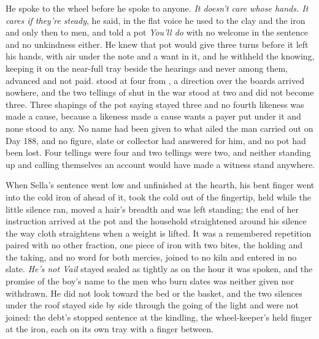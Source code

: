 He spoke to the wheel before he spoke to anyone. \emph{It doesn't care whose hands. It cares if they're steady}, he said, in the flat voice he used to the clay and the iron and only then to men, and told a pot \emph{You'll do} with no welcome in the sentence and no unkindness either. He knew  that pot would give three turns before it left his hands, with air under the note and a want in it, and he withheld the knowing, keeping it on the near-full tray beside the hearings and never among them, advanced and not paid.  stood at four from , a direction over the boards arrived nowhere, and the two tellings of  shut in the war stood at two and did not become three. Three shapings of the pot saying stayed three and no fourth likeness was made a cause, because a likeness made a cause wants a payer put under it and none stood to any. No name had been given to what ailed the man carried out on Day 188, and no figure, slate or collector had answered for him, and no pot had been lost. Four tellings were four and two tellings were two, and neither standing up and calling themselves an account would have made a witness stand anywhere.

When Sella's sentence went low and unfinished at the hearth, his bent finger went into the cold iron of  ahead of it, took the cold out of the fingertip, held while the little silence ran, moved a hair's breadth and was left standing; the end of her instruction arrived at the pot and the household straightened around his silence the way cloth straightens when a weight is lifted. It was a remembered repetition paired with no other fraction, one piece of iron with two bites, the holding and the taking, and no  word for both mercies, joined to no kiln and entered in no slate. \emph{He's not Vail} stayed sealed as tightly as on the hour it was spoken, and the promise of the boy's name to the men who burn slates was neither given nor withdrawn. He did not look toward the bed or the basket, and the two silences under the roof stayed side by side through the going of the light and were not joined: the debt's stopped sentence at the kindling, the wheel-keeper's held finger at the iron, each on its own tray with a finger between.

\scenebreak

